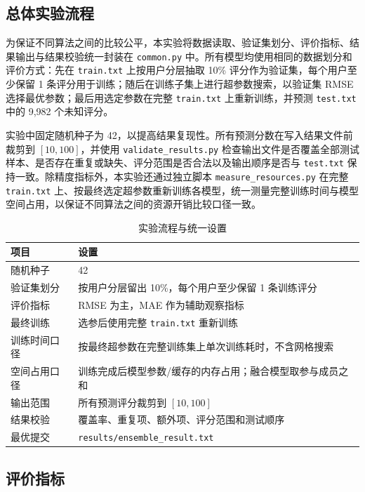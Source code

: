 \documentclass[UTF8,a4paper,10pt]{ctexart}
\begin{document}
\subsection{总体实验流程}

为保证不同算法之间的比较公平，本实验将数据读取、验证集划分、评价指标、结果输出与结果校验统一封装在 \texttt{common.py} 中。所有模型均使用相同的数据划分和评价方式：先在 \texttt{train.txt} 上按用户分层抽取 10\% 评分作为验证集，每个用户至少保留 1 条评分用于训练；随后在训练子集上进行超参数搜索，以验证集 RMSE 选择最优参数；最后用选定参数在完整 \texttt{train.txt} 上重新训练，并预测 \texttt{test.txt} 中的 9,982 个未知评分。

实验中固定随机种子为 42，以提高结果复现性。所有预测分数在写入结果文件前裁剪到 $[10,100]$，并使用 \texttt{validate\_results.py} 检查输出文件是否覆盖全部测试样本、是否存在重复或缺失、评分范围是否合法以及输出顺序是否与 \texttt{test.txt} 保持一致。除精度指标外，本实验还通过独立脚本 \texttt{measure\_resources.py} 在完整 \texttt{train.txt} 上、按最终选定超参数重新训练各模型，统一测量完整训练时间与模型空间占用，以保证不同算法之间的资源开销比较口径一致。

\begin{table}[H]
    \centering
    \caption{实验流程与统一设置}
    \label{tab:experiment_protocol}
    \begin{tabular}{@{}ll@{}}
        \toprule
        \textbf{项目} & \textbf{设置} \\
        \midrule
        随机种子 & 42 \\
        验证集划分 & 按用户分层留出 10\%，每个用户至少保留 1 条训练评分 \\
        评价指标 & RMSE 为主，MAE 作为辅助观察指标 \\
        最终训练 & 选参后使用完整 \texttt{train.txt} 重新训练 \\
        训练时间口径 & 按最终超参数在完整训练集上单次训练耗时，不含网格搜索 \\
        空间占用口径 & 训练完成后模型参数/缓存的内存占用；融合模型取参与成员之和 \\
        输出范围 & 所有预测评分裁剪到 $[10,100]$ \\
        结果校验 & 覆盖率、重复项、额外项、评分范围和测试顺序 \\
        最优提交 & \texttt{results/ensemble\_result.txt} \\
        \bottomrule
    \end{tabular}
\end{table}

\subsection{评价指标}
\end{document}
